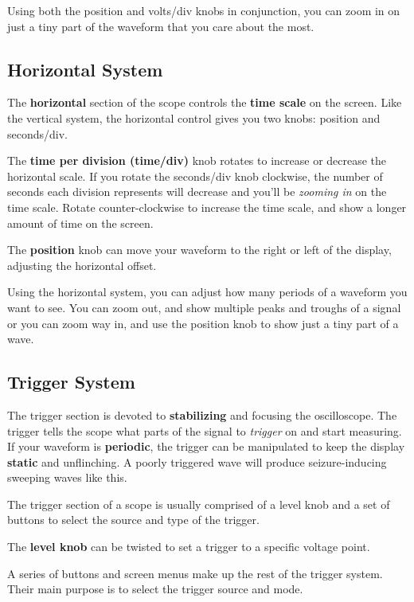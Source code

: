 \documentclass[12pt, logo=tehranDLDL/ut]{tehranDLDL}
\begin{document}
Using both the position and volts/div knobs in conjunction, you can zoom in on just a tiny part of the waveform that you care about the most.

\subsection{Horizontal System}

The \textbf{horizontal} section of the scope controls the \textbf{time scale} on the screen. Like the vertical system, the horizontal control gives you two knobs: position and seconds/div.

The \textbf{time per division (time/div)} knob rotates to increase or decrease the horizontal scale. If you rotate the seconds/div knob clockwise, the number of seconds each division represents will decrease and you'll be \textit{zooming in} on the time scale. Rotate counter-clockwise to increase the time scale, and show a longer amount of time on the screen.

The \textbf{position} knob can move your waveform to the right or left of the display, adjusting the horizontal offset.

Using the horizontal system, you can adjust how many periods of a waveform you want to see. You can zoom out, and show multiple peaks and troughs of a signal or you can zoom way in, and use the position knob to show just a tiny part of a wave.

\subsection{Trigger System}

The trigger section is devoted to \textbf{stabilizing} and focusing the oscilloscope. The trigger tells the scope what parts of the signal to \textit{trigger} on and start measuring. If your waveform is \textbf{periodic}, the trigger can be manipulated to keep the display \textbf{static} and unflinching. A poorly triggered wave will produce seizure-inducing sweeping waves like this.

The trigger section of a scope is usually comprised of a level knob and a set of buttons to select the source and type of the trigger.

The \textbf{level knob} can be twisted to set a trigger to a specific voltage point.

A series of buttons and screen menus make up the rest of the trigger system. Their main purpose is to select the trigger source and mode.
\end{document}
